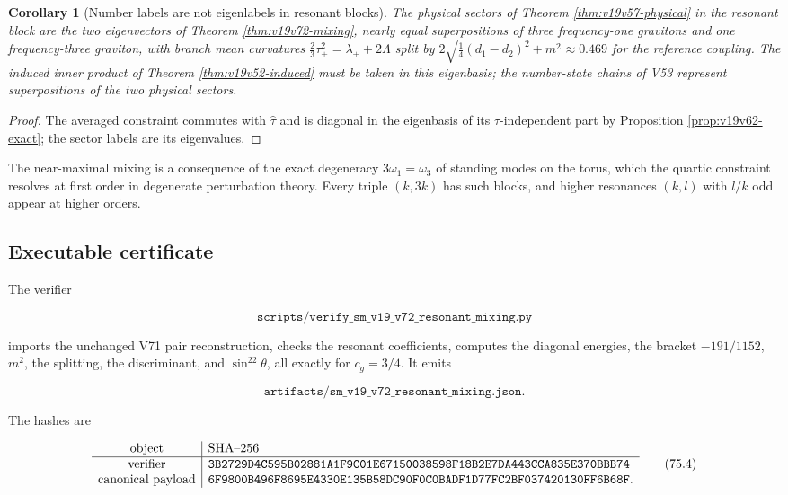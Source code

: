 \documentclass[11pt]{article}
\newtheorem{corollary}[theorem]{Corollary}
\theoremstyle{remark}
\begin{document}
\begin{corollary}[Number labels are not eigenlabels in resonant blocks]
\label{cor:v19v72-labels}
The physical sectors of Theorem \ref{thm:v19v57-physical} in the
resonant block are the two eigenvectors of Theorem
\ref{thm:v19v72-mixing}, nearly equal superpositions of three
frequency-one gravitons and one frequency-three graviton, with branch
mean curvatures \(\tfrac23\tau_\pm^2=\lambda_\pm+2\Lambda\) split by
\(2\sqrt{\tfrac14(d_1-d_2)^2+m^2}\approx0.469\) for the reference
coupling.  The induced inner product of Theorem
\ref{thm:v19v52-induced} must be taken in this eigenbasis; the
number-state chains of V53 represent superpositions of the two
physical sectors.
\end{corollary}

\begin{proof}
The averaged constraint commutes with \(\hat\tau\) and is diagonal in
the eigenbasis of its \(\tau\)-independent part by Proposition
\ref{prop:v19v62-exact}; the sector labels are its eigenvalues.
\end{proof}

The near-maximal mixing is a consequence of the exact degeneracy
\(3\omega_1=\omega_3\) of standing modes on the torus, which the
quartic constraint resolves at first order in degenerate perturbation
theory.  Every triple \((k,3k)\) has such blocks, and higher resonances
\((k,l)\) with \(l/k\) odd appear at higher orders.

\subsection{Executable certificate}

The verifier

\[
 \texttt{scripts/verify\_sm\_v19\_v72\_resonant\_mixing.py}          \tag{75.2}
\]

imports the unchanged V71 pair reconstruction, checks the resonant
coefficients, computes the diagonal energies, the bracket
\(-191/1152\), \(m^2\), the splitting, the discriminant, and
\(\sin^22\theta\), all exactly for \(c_g=3/4\).  It emits

\[
 \texttt{artifacts/sm\_v19\_v72\_resonant\_mixing.json}.             \tag{75.3}
\]

The hashes are

\[
\begin{array}{c|l}
\hbox{object}&\hbox{SHA--256}\\ \hline
\hbox{verifier}&
\texttt{3B2729D4C595B02881A1F9C01E67150038598F18B2E7DA443CCA835E370BBB74}\\
\hbox{canonical payload}&
\texttt{6F9800B496F8695E4330E135B58DC90F0C0BADF1D77FC2BF037420130FF6B68F}.
\end{array}                                                     \tag{75.4}
\]
\end{document}

